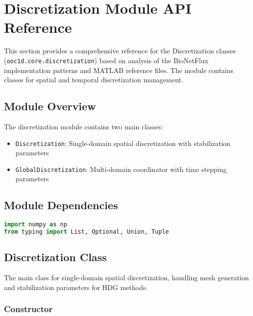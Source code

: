 %

\section{Discretization Module API Reference}
\label{sec:discretization_module_api}

This section provides a comprehensive reference for the Discretization classes (\texttt{ooc1d.core.discretization}) based on analysis of the BioNetFlux implementation patterns and MATLAB reference files. The module contains classes for spatial and temporal discretization management.

\subsection{Module Overview}

The discretization module contains two main classes:
\begin{itemize}
    \item \texttt{Discretization}: Single-domain spatial discretization with stabilization parameters
    \item \texttt{GlobalDiscretization}: Multi-domain coordinator with time stepping parameters
\end{itemize}

\subsection{Module Dependencies}

\begin{lstlisting}[language=Python, caption=Module Dependencies]
import numpy as np
from typing import List, Optional, Union, Tuple
\end{lstlisting}

\subsection{Discretization Class}
\label{subsec:discretization_class}

The main class for single-domain spatial discretization, handling mesh generation and stabilization parameters for HDG methods.

\subsubsection{Constructor}


